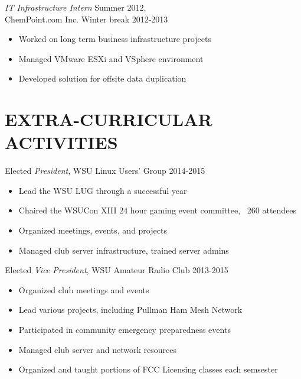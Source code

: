 \documentclass[line, margin]{res}
\begin{document}
\begin{resume}
                {\sl IT Infrastructure Intern} \hfill           Summer 2012,\\
                ChemPoint.com Inc. \hfill Winter break 2012-2013
                 \begin{itemize}  \itemsep -2pt %
                 \item  Worked on long term business infrastructure projects
                 \item  Managed VMware ESXi and VSphere environment
                 \item  Developed solution for offsite data duplication
                 \end{itemize} 
 

\section{EXTRA-CURRICULAR \\ ACTIVITIES}             
            Elected {\it President}, WSU Linux Users' Group \hfill 2014-2015
        \begin{itemize} \itemsep -2pt
                \item Lead the WSU LUG through a successful year
                \item Chaired the WSUCon XIII 24 hour gaming event committee, ~260 attendees
                \item Organized meetings, events, and projects
                \item Managed club server infrastructure, trained server admins
            \end{itemize}
            Elected {\it Vice President}, WSU Amateur Radio Club \hfill 2013-2015
        \begin{itemize} \itemsep -2pt
                \item Organized club meetings and events
                \item Lead various projects, including Pullman Ham Mesh Network
                \item Participated in community emergency preparedness events
                \item Managed club server and network resources
                \item Organized and taught portions of FCC Licensing classes each semsester
            \end{itemize}


\end{resume}
\end{document}
